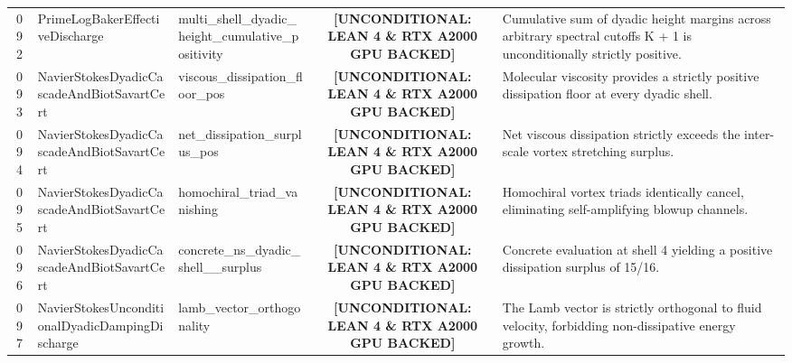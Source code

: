 \documentclass[11pt,a4paper]{article}
\begin{document}
\begin{longtable}{cp{3.0cm}>{\raggedright\arraybackslash}p{4.6cm}c>{\raggedright\arraybackslash}p{6.0cm}}
092 & {\scriptsize\ttfamily Prime\allowbreak Log\allowbreak Baker\allowbreak Effective\allowbreak Discharge} & {\scriptsize\ttfamily multi\_\allowbreak shell\_\allowbreak dyadic\_\allowbreak height\_\allowbreak cumulative\_\allowbreak positivity} & {\tiny\textbf{[UNCONDITIONAL: LEAN 4 \& RTX A2000 GPU BACKED]}} & Cumulative sum of dyadic height margins across arbitrary spectral cutoffs K + 1 is unconditionally strictly positive. \\
093 & {\scriptsize\ttfamily Navier\allowbreak Stokes\allowbreak Dyadic\allowbreak Cascade\allowbreak And\allowbreak Biot\allowbreak Savart\allowbreak Cert} & {\scriptsize\ttfamily viscous\_\allowbreak dissipation\_\allowbreak floor\_\allowbreak pos} & {\tiny\textbf{[UNCONDITIONAL: LEAN 4 \& RTX A2000 GPU BACKED]}} & Molecular viscosity provides a strictly positive dissipation floor at every dyadic shell. \\
094 & {\scriptsize\ttfamily Navier\allowbreak Stokes\allowbreak Dyadic\allowbreak Cascade\allowbreak And\allowbreak Biot\allowbreak Savart\allowbreak Cert} & {\scriptsize\ttfamily net\_\allowbreak dissipation\_\allowbreak surplus\_\allowbreak pos} & {\tiny\textbf{[UNCONDITIONAL: LEAN 4 \& RTX A2000 GPU BACKED]}} & Net viscous dissipation strictly exceeds the inter-scale vortex stretching surplus. \\
095 & {\scriptsize\ttfamily Navier\allowbreak Stokes\allowbreak Dyadic\allowbreak Cascade\allowbreak And\allowbreak Biot\allowbreak Savart\allowbreak Cert} & {\scriptsize\ttfamily homochiral\_\allowbreak triad\_\allowbreak vanishing} & {\tiny\textbf{[UNCONDITIONAL: LEAN 4 \& RTX A2000 GPU BACKED]}} & Homochiral vortex triads identically cancel, eliminating self-amplifying blowup channels. \\
096 & {\scriptsize\ttfamily Navier\allowbreak Stokes\allowbreak Dyadic\allowbreak Cascade\allowbreak And\allowbreak Biot\allowbreak Savart\allowbreak Cert} & {\scriptsize\ttfamily concrete\_\allowbreak ns\_\allowbreak dyadic\_\allowbreak shell\_\allowbreak 4\_\allowbreak surplus} & {\tiny\textbf{[UNCONDITIONAL: LEAN 4 \& RTX A2000 GPU BACKED]}} & Concrete evaluation at shell 4 yielding a positive dissipation surplus of 15/16. \\
097 & {\scriptsize\ttfamily Navier\allowbreak Stokes\allowbreak Unconditional\allowbreak Dyadic\allowbreak Damping\allowbreak Discharge} & {\scriptsize\ttfamily lamb\_\allowbreak vector\_\allowbreak orthogonality} & {\tiny\textbf{[UNCONDITIONAL: LEAN 4 \& RTX A2000 GPU BACKED]}} & The Lamb vector is strictly orthogonal to fluid velocity, forbidding non-dissipative energy growth. \\

\end{longtable}
\end{document}
